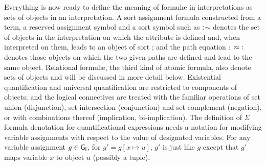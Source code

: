 \documentclass[output=paper,biblatex,babelshorthands,newtxmath,draftmode,colorlinks,citecolor=brown]{langscibook}
\begin{document}
{Everything is now ready to define the meaning of formulæ in
interpretations as sets of objects in an interpretation. A
sort assignment formula constructed from a term, a reserved assignment
symbol and a sort symbol such as
$\operatorname{:}$$\sim$ denotes the set
of objects in the interpretation on which the  attribute
is defined and, when interpreted on them, leads to an object of sort
; and the path equation $\operatorname{:}$ $\approx\operatorname{:}$ denotes those objects on which the two given paths are
defined and lead to the same object. Relational formulæ, the
third kind of atomic formula, also denote sets of objects and will
be discussed in more detail below. Existential quantification and universal
quantification are restricted to components of objects; and the logical
connectives are treated with the familiar operations of set union
(disjunction), set intersection (conjunction) and set complement (negation),
or with combinations thereof (implication, bi-implication).
The definition of $\Sigma$ formula denotation for quantificational
expressions needs a
notation for modifying variable assignments with respect to the
value of designated variables. For any variable assignment $g\in\mathsf{G}_{\mathsf{I}}$,
for $g'=g[x \mapsto u]$, $g'$ is just like $g$ except that
$g'$ maps variable $x$ to object $u$ (possibly a tuple).


}
\end{document}

